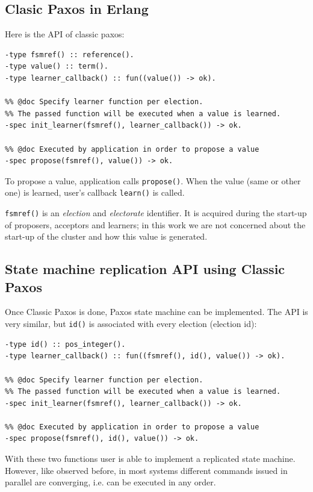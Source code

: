 \documentclass[english,11pt]{l4proj}
\begin{document}
\subsection{Clasic Paxos in Erlang}

Here is the API of classic paxos:

\begin{verbatim}
-type fsmref() :: reference().
-type value() :: term().
-type learner_callback() :: fun((value()) -> ok).

%% @doc Specify learner function per election.
%% The passed function will be executed when a value is learned.
-spec init_learner(fsmref(), learner_callback()) -> ok.

%% @doc Executed by application in order to propose a value
-spec propose(fsmref(), value()) -> ok.
\end{verbatim}

To propose a value, application calls {\tt propose()}. When the value (same or
other one) is learned, user's callback {\tt learn()} is called.

{\tt fsmref()} is an \emph{election} and \emph{electorate} identifier. It is
acquired during the start-up of proposers, acceptors and learners; in this work
we are not concerned about the start-up of the cluster and how this value is
generated.

\subsection{State machine replication API using Classic Paxos}

Once Classic Paxos is done, Paxos state machine can be implemented. The API is
very similar, but {\tt id()} is associated with every election (election id):

\begin{verbatim}
-type id() :: pos_integer().
-type learner_callback() :: fun((fsmref(), id(), value()) -> ok).

%% @doc Specify learner function per election.
%% The passed function will be executed when a value is learned.
-spec init_learner(fsmref(), learner_callback()) -> ok.

%% @doc Executed by application in order to propose a value
-spec propose(fsmref(), id(), value()) -> ok.
\end{verbatim}

With these two functions user is able to implement a replicated state machine.
However, like observed before, in most systems different commands issued in
parallel are converging, i.e. can be executed in any order.
\end{document}
